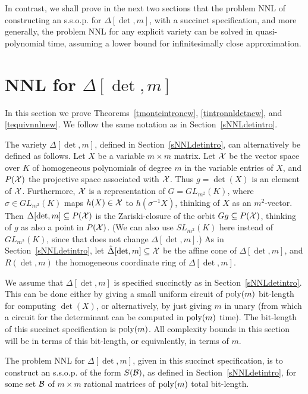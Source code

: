 \documentclass[11pt]{article}
\begin{document}
In contrast, we shall prove in the next two sections that the problem 
NNL of constructing an s.s.o.p. 
for $\Delta[\det,m]$, with a succinct specification, and more generally, the problem NNL 
for any explicit variety  can be solved 
in quasi-polynomial time, assuming a lower bound for infinitesimally
close approximation.



%
\section{NNL for $\Delta[\det,m]$} \label{snnldeter}
In this section we prove Theorems~\ref{tmonteintronew}, \ref{tintronnldetnew},  and \ref{tequivnnlnew}.
We follow the same notation as in Section~\ref{sNNLdetintro}. 


The variety $\Delta[\det,m]$, defined in Section~\ref{sNNLdetintro},  can alternatively be defined as follows.
Let $X$ be a variable  $m\times m$ 
matrix.  Let ${\cal X}$ be the 
vector space over $K$ of homogeneous polynomials of degree $m$ in the 
variable entries of $X$, and $P({\cal X})$ the projective space associated with ${\cal X}$.
Thus $g=\det(X)$ is an element of ${\cal X}$.  Furthermore, ${\cal X}$ is a 
representation of $G=GL_{m^2}(K)$, where $\sigma \in GL_{m^2}(K)$ maps $h(X) 
\in {\cal X}$ to $h(\sigma^{-1} X)$, thinking of $X$ 
as an $m^2$-vector. 
Then $\Delta[\det,m] \subseteq P({\cal X})$ is the Zariski-closure 
of the orbit $G g \subseteq P({\cal X})$, thinking of $g$  as also a point in $P({\cal X})$. 
(We can also use  $SL_{m^2}(K)$ here
instead of $GL_{m^2}(K)$, since that does not change $\Delta[\det,m]$.)
As in Section~\ref{sNNLdetintro}, let $\hat \Delta[\det,m] \subseteq {\cal X}$ be the affine cone of $\Delta[\det,m]$, and 
$R(\det,m)$ the homogeneous coordinate ring of $\Delta[\det,m]$.

We assume that 
$\Delta[\det,m]$ is specified succinctly as in Section~\ref{sNNLdetintro}.
This can be done either by  giving a small uniform circuit of 
${\mbox {poly}}(m)$ bit-length  for computing $\det(X)$, or alternatively, by 
just giving $m$ in unary (from which a circuit for the determinant can 
be computed in ${\mbox {poly}}(m)$ time). 
The bit-length of this succinct specification 
is ${\mbox {poly}}(m)$. All complexity bounds in this section
will be in terms of this bit-length, or equivalently, in terms of $m$. 

The problem NNL  for $\Delta[\det,m]$, given in  this succinct specification, is to 
construct an   s.s.o.p. of the form $S({\cal B})$,  as defined in Section~\ref{sNNLdetintro}, 
for some set ${\cal B}$ of $m\times m$ rational matrices of ${\mbox {poly}}(m)$ total bit-length.
\end{document}
